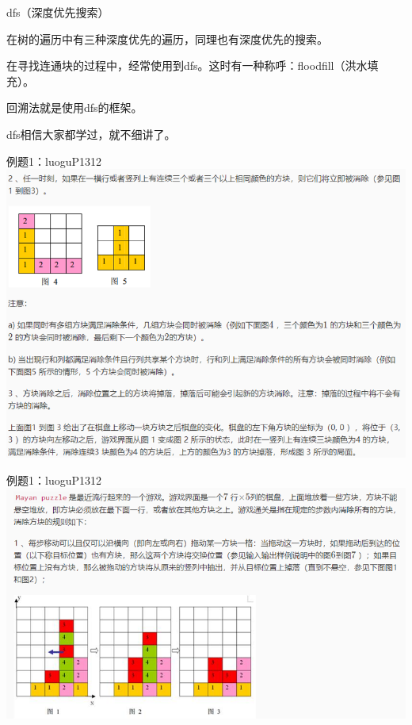 \documentclass{bemaer}[UTF-8]
\begin{document}
\begin{frame}{dfs（深度优先搜索）}
\item 在树的遍历中有三种深度优先的遍历，同理也有深度优先的搜索。
\item 在寻找连通块的过程中，经常使用到dfs。这时有一种称呼：floodfill（洪水填充）。
\item 回溯法就是使用dfs的框架。
\item dfs相信大家都学过，就不细讲了。
\end{frame}

\begin{frame}{例题1：luoguP1312}
\includegraphics{temp1.png}
\end{frame}

\begin{frame}{例题1：luoguP1312}
\includegraphics{temp2.png}
\end{frame}
\end{document}

